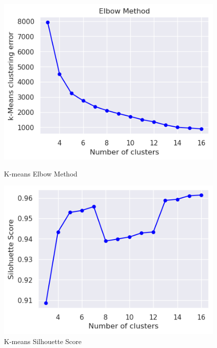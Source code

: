         \begin{figure}[h]
            \centering
            \begin{minipage}[c]{0.47\textwidth}
                \centering
                \includegraphics[width=\textwidth]{../figures/plots/section3/k-means_clustering_error.png}
                \caption{K-means Elbow Method}
                \label{fig:kmeans_elbowmethod}
            \end{minipage}
            \hfill
            \begin{minipage}[c]{0.47\textwidth}
                \centering
                \includegraphics[width=\textwidth]{../figures/plots/section3/k-means_silohuette_score.png}
                \caption{K-means Silhouette Score}
                \label{fig:kmeans_silhouette_score}
            \end{minipage}
        \end{figure}
        

